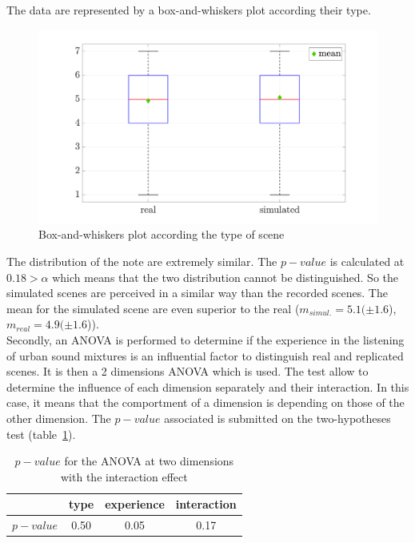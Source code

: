 \documentclass[a4,11pt,twocolumn]{article}
\begin{document}
The data are represented by a box-and-whiskers plot according their type.
\begin{figure}[hbtp]
\centering
\includegraphics[width=\linewidth]{./pictures/testPerceptif_boxplotType_EN.pdf}
\caption{Box-and-whiskers plot according the type of scene}
\label{fig:boxplot_real_simul}
\end{figure}

The distribution of the note are extremely similar. The $p-value$ is calculated at $0.18 > \alpha$ which means that the two distribution cannot be distinguished. So the simulated scenes are perceived in a similar way than the recorded scenes. The mean for the simulated scene are even superior to the real ($m_{simul.} = 5.1 (\pm 1.6$), $ m_{real} = 4.9 (\pm 1.6$)). \\

Secondly, an ANOVA is performed to determine if the experience in the listening of urban sound mixtures is an influential factor to distinguish real and replicated scenes. It is then a 2 dimensions ANOVA which is used. The test allow to determine  the influence of each dimension separately and their interaction. In this case, it means that the comportment of a dimension is depending on those of the other dimension. The $p-value$ associated is submitted on the two-hypotheses test (table~\ref{tab:p_value_type_exp}).\\

\begin{table}[h]
\centering
\begin{tabular}{cccc}
\cline{2-4}
          & type & experience & interaction \\
\hline
$p-value$ & 0.50 & 0.05 & 0.17 \\
\hline
\end{tabular}
\caption{$p-value$ for the ANOVA at two dimensions with the interaction effect}
\label{tab:p_value_type_exp}
\end{table}
\end{document}
